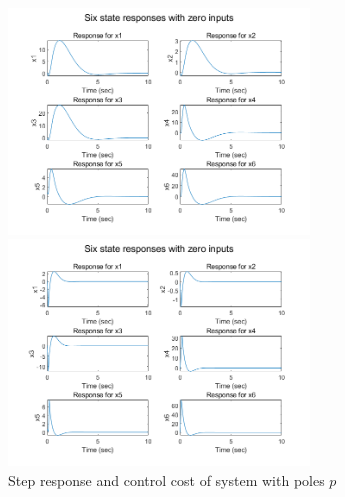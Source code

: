 \documentclass[hyperref]{article}
\theoremstyle{nonumberplain}
\begin{document}
	\begin{figure}[H]
		\centering
		\begin{minipage}[t]{0.48\textwidth}
			\centering
			\includegraphics[width=8cm]{fig41.png}
		\end{minipage}
		\begin{minipage}[t]{0.48\textwidth}
			\centering
			\includegraphics[width=8cm]{fig43.png}
		\end{minipage}
		\caption{Step response and control cost of system with poles ${p}$}
		\label{fig8}
	\end{figure}
	
\end{document}
